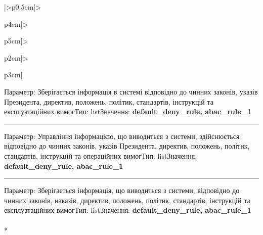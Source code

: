 \documentclass[10pt]{article}
\begin{document}
\begin{longtable}{|>{\centering\arraybackslash}p{0.5cm}|>{\raggedright\arraybackslash}p{4cm}|>{\raggedright\arraybackslash}p{5cm}|>{\raggedright\arraybackslash}p{2cm}|>{\raggedright\arraybackslash}p{3cm}|}
Параметр: Зберігається інформація в системі відповідно до чинних законів, указів Президента, директив, положень, політик, стандартів, інструкцій та експлуатаційних вимог\newline Тип: list\newline Значення: \textbf{default\_\allowbreak{}deny\_\allowbreak{}rule, abac\_\allowbreak{}rule\_\allowbreak{}1}\vspace{1mm}\newline\noindent\rule{\linewidth}{0.4pt}\vspace{1mm}
Параметр: Управління інформацією, що виводиться з системи, здійснюється відповідно до чинних законів, указів Президента, директив, положень, політик, стандартів, інструкцій та операційних вимог\newline Тип: list\newline Значення: \textbf{default\_\allowbreak{}deny\_\allowbreak{}rule, abac\_\allowbreak{}rule\_\allowbreak{}1}\vspace{1mm}\newline\noindent\rule{\linewidth}{0.4pt}\vspace{1mm}
Параметр: Зберігається інформація, що виводиться з системи, відповідно до чинних законів, наказів, директив, положень, політик, стандартів, інструкцій та експлуатаційних вимог\newline Тип: list\newline Значення: \textbf{default\_\allowbreak{}deny\_\allowbreak{}rule, abac\_\allowbreak{}rule\_\allowbreak{}1} \\ \hline
{} \\* 

\end{longtable}
\end{document}
